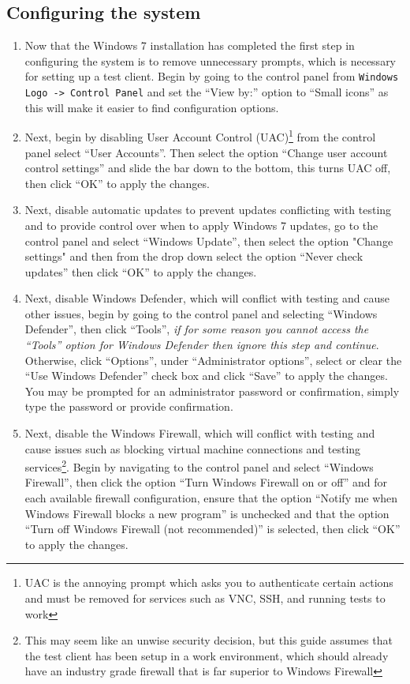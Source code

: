 \subsection{Configuring the system}
\label{sec:windows7config}
\begin{enumerate}
\item	Now that the Windows 7 installation has completed the first step in configuring the system is to remove unnecessary prompts,
		which is necessary for setting up a test client. Begin by going to the control panel from \verb|Windows Logo -> Control Panel|
		and set the ``View by:'' option to ``Small icons'' as this will make it easier to find configuration options.
		
\item	Next, begin by disabling User Account Control (UAC)\footnote{UAC is the annoying prompt which asks you to authenticate certain
		actions and must be removed for services such as VNC, SSH, and running tests to work} from the control panel select ``User Accounts''.
		Then select the option ``Change user account control settings'' and slide the bar down to the bottom, this turns UAC off, then click
		``OK'' to apply the changes.
		
\item	Next, disable automatic updates to prevent updates conflicting with testing and to provide control over when to apply Windows 7 updates,
		go to the control panel and select ``Windows Update'', then select the option "Change settings" and then from the drop down select the 
		option ``Never check updates'' then click ``OK'' to apply the changes.
		
\item	Next, disable Windows Defender, which will conflict with testing and cause other issues, begin by going to the control panel and 
		selecting ``Windows Defender'', then click ``Tools'', \emph{if for some reason you cannot access the ``Tools'' option for
		Windows Defender then ignore this step and continue}. Otherwise, click ``Options'', under ``Administrator options'', select or clear 
		the ``Use Windows Defender'' check box and click ``Save'' to apply the changes. You may be prompted for an administrator password or 	
		confirmation, simply type the password or provide confirmation.
		
\item	Next, disable the Windows Firewall, which will conflict with testing and cause issues such as blocking virtual machine connections 
		and testing services\footnote{This may seem like an unwise security decision, but this guide assumes that the test client has been
		setup in a work environment, which should already have an industry grade firewall that is far superior to Windows Firewall}.
		Begin by navigating to the control panel and select ``Windows Firewall'', then click the option ``Turn Windows Firewall on
		or off'' and for each available firewall configuration, ensure that the option ``Notify me when Windows Firewall blocks a new
		program'' is unchecked and that the option ``Turn off Windows Firewall (not recommended)'' is selected, then click ``OK'' to
		apply the changes.
		

\end{enumerate}
